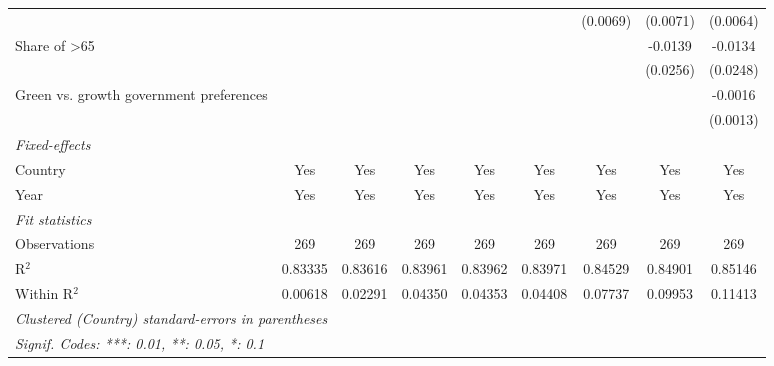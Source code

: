\begin{table}[htbp]
\begin{tabular}{lcccccccc}
                                               &          &               &          &          &                       & (0.0069) & (0.0071) & (0.0064)\\   
      Share of >65                             &          &               &          &          &                       &          & -0.0139  & -0.0134\\   
                                               &          &               &          &          &                       &          & (0.0256) & (0.0248)\\   
      Green vs. growth government preferences  &          &               &          &          &                       &          &          & -0.0016\\   
                                               &          &               &          &          &                       &          &          & (0.0013)\\   
      \midrule
      \emph{Fixed-effects}\\
      Country                                  & Yes      & Yes           & Yes      & Yes      & Yes                   & Yes      & Yes      & Yes\\  
      Year                                     & Yes      & Yes           & Yes      & Yes      & Yes                   & Yes      & Yes      & Yes\\  
      \midrule
      \emph{Fit statistics}\\
      Observations                             & 269      & 269           & 269      & 269      & 269                   & 269      & 269      & 269\\  
      R$^2$                                    & 0.83335  & 0.83616       & 0.83961  & 0.83962  & 0.83971               & 0.84529  & 0.84901  & 0.85146\\  
      Within R$^2$                             & 0.00618  & 0.02291       & 0.04350  & 0.04353  & 0.04408               & 0.07737  & 0.09953  & 0.11413\\  
      \midrule \midrule
      \multicolumn{9}{l}{\emph{Clustered (Country) standard-errors in parentheses}}\\
      \multicolumn{9}{l}{\emph{Signif. Codes: ***: 0.01, **: 0.05, *: 0.1}}\\
   \end{tabular}
\end{table}


